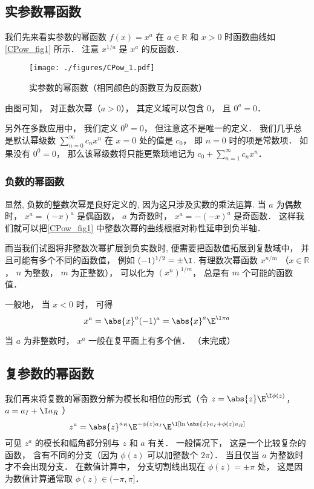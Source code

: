 

\subsection{实参数幂函数}
我们先来看实参数的幂函数 $f(x) = x^a$ 在 $a\in\mathbb R$ 和 $x > 0$ 时函数曲线如\autoref{CPow_fig1} 所示． 注意 $x^{1/a}$ 是 $x^a$ 的反函数．
\begin{figure}[ht]
\centering
\texttt{[image: ./figures/CPow\_1.pdf]}
\caption{实参数的幂函数（相同颜色的函数互为反函数）} \label{CPow_fig1}
\end{figure}

由图可知， 对正数次幂（$a > 0$）， 其定义域可以包含 $0$， 且 $0^a = 0$．

另外在多数应用中， 我们定义 $0^0 = 0$， 但注意这不是唯一的定义． 我们几乎总是默认幂级数 $\sum_{n=0}^\infty c_n x^n$ 在 $x = 0$ 处的值是 $c_0$， 即 $n=0$ 时的项是常数项． 如果没有 $0^0 = 0$， 那么该幂级数将只能更繁琐地记为 $c_0 + \sum_{n=1}^\infty c_n x^n$．

\subsubsection{负数的幂函数}
显然, 负数的整数次幂是良好定义的, 因为这只涉及实数的乘法运算. 当 $a$ 为偶数时， $x^a = (-x)^a$ 是偶函数， $a$ 为奇数时， $x^a = -(-x)^a$ 是奇函数． 这样我们就可以把\autoref{CPow_fig1} 中整数次幂的曲线根据对称性延申到负半轴．

而当我们试图将非整数次幂扩展到负实数时, 便需要把函数值拓展到复数域中， 并且可能有多个不同的函数值， 例如 $(-1)^{1/2} = \pm\I$.  有理数次幂函数 $x^{n/m}$ （$x\in \mathbb R$， $n$ 为整数， $m$ 为正整数）， 可以化为 $(x^n)^{1/m}$， 总是有 $m$ 个可能的函数值．

一般地， 当 $x < 0$ 时， 可得
\begin{equation}
x^a = \abs{x}^a (-1)^a = \abs{x}^a\E^{\I\pi a}
\end{equation}


当 $a$ 为非整数时， $x^a$ 一般在复平面上有多个值． （未完成）

\subsection{复参数的幂函数}
我们再来将复数的幂函数分解为模长和相位的形式（令 $z = \abs{z} \E^{\I\phi(z)}$， $a = a_I + \I a_R$ ）
\begin{equation}
z^a = \abs{z}^{a_R} \E^{-\phi(z) a_I} \E^{\I[\ln\abs{z}a_I + \phi(z)a_R]}
\end{equation}
可见 $z^a$ 的模长和幅角都分别与 $z$ 和 $a$ 有关． 一般情况下， 这是一个比较复杂的函数， 含有不同的分支（因为 $\phi(z)$ 可以加整数个 $2\pi$）．%
当且仅当 $a$ 为整数时才不会出现分支． 在数值计算中， 分支切割线出现在 $\phi(z) = \pm\pi$ 处， 这是因为数值计算通常取 $\phi(z)\in(-\pi, \pi]$．
